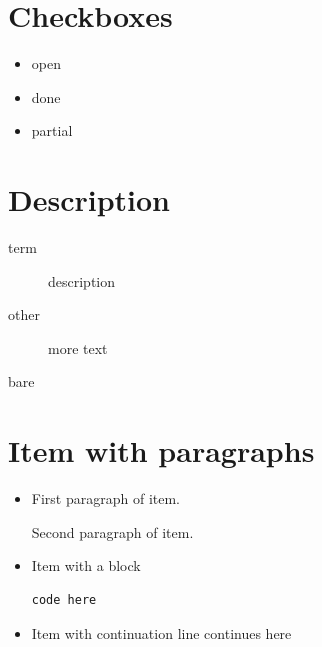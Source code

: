 \documentclass[11pt]{article}
\begin{document}
\section{Checkboxes}
\label{sec:orga20c077}
\begin{itemize}
\item[{$\square$}] open
\item[{$\boxtimes$}] done
\item[{$\boxminus$}] partial
\end{itemize}
\section{Description}
\label{sec:org119bb47}
\begin{description}
\item[{term}] description
\item[{other}] more text
\item[{bare}] 
\end{description}
\section{Item with paragraphs}
\label{sec:org1a894f6}
\begin{itemize}
\item First paragraph of item.

Second paragraph of item.
\item Item with a block
\begin{verbatim}
code here
\end{verbatim}
\item Item with continuation
line continues here
\end{itemize}
\end{document}
